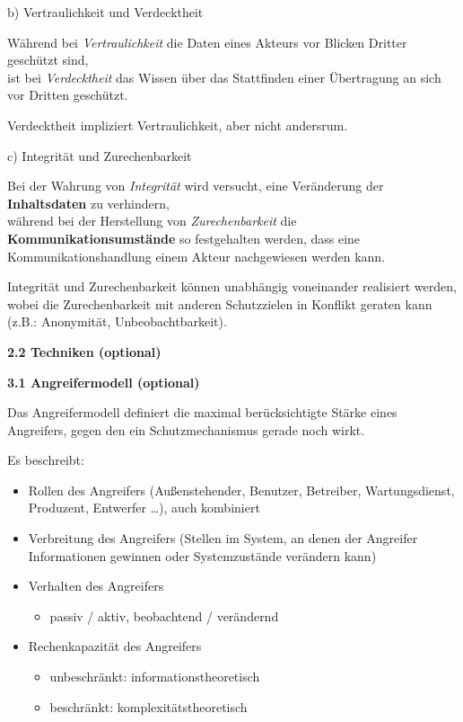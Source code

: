 \documentclass[ngerman]{fbi-aufgabenblatt}
\begin{document}
b) Vertraulichkeit und Verdecktheit

Während bei \emph{Vertraulichkeit} die Daten eines Akteurs vor Blicken Dritter geschützt sind, \\
ist bei \emph{Verdecktheit} das Wissen über das Stattfinden einer Übertragung an sich vor Dritten geschützt.

Verdecktheit impliziert Vertraulichkeit, aber nicht andersrum. 

c) Integrität und Zurechenbarkeit

Bei der Wahrung von \emph{Integrität} wird versucht, eine Veränderung der \textbf{Inhaltsdaten} zu verhindern,\\ 
während bei der Herstellung von \emph{Zurechenbarkeit} die \textbf{Kommunikationsumstände} so festgehalten werden, dass eine Kommunikationshandlung einem Akteur nachgewiesen werden kann.

Integrität und Zurechenbarkeit können unabhängig voneinander realisiert werden, wobei die Zurechenbarkeit mit anderen Schutzzielen in Konflikt geraten kann (z.B.: Anonymität, Unbeobachtbarkeit).     


\textbf{2.2 Techniken (optional)}


\newpage
{}

\textbf{3.1 Angreifermodell (optional)}

Das Angreifermodell definiert die maximal berücksichtigte Stärke eines
Angreifers, gegen den ein Schutzmechanismus gerade noch wirkt.

Es beschreibt:
\begin{itemize}
\item Rollen des Angreifers (Außenstehender, Benutzer, Betreiber,
Wartungsdienst, Produzent, Entwerfer …), auch kombiniert
\item Verbreitung des Angreifers (Stellen im System, an denen der
Angreifer Informationen gewinnen oder Systemzustände verändern kann)\\
\item Verhalten des Angreifers
	\begin{itemize}
   \item passiv / aktiv, beobachtend / verändernd
   \end{itemize}
\item Rechenkapazität des Angreifers
	\begin{itemize}
   \item unbeschränkt: informationstheoretisch
   \item beschränkt: komplexitätstheoretisch
   \end{itemize}
\end{itemize}
\end{document}
